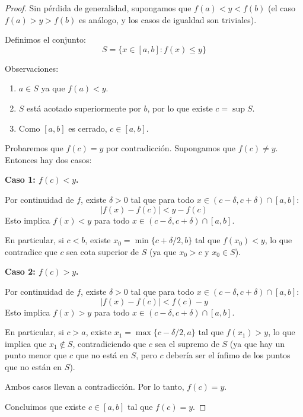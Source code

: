 \documentclass[11pt,a4paper]{article}
\theoremstyle{plain}
\theoremstyle{definition}
\begin{document}
\begin{proof}
Sin pérdida de generalidad, supongamos que $f(a) < y < f(b)$ (el caso $f(a) > y > f(b)$ es análogo, y los casos de igualdad son triviales).

Definimos el conjunto:
\[
S = \{x \in [a, b] : f(x) \leq y\}
\]

Observaciones:
\begin{enumerate}
    \item $a \in S$ ya que $f(a) < y$.
    \item $S$ está acotado superiormente por $b$, por lo que existe $c = \sup S$.
    \item Como $[a, b]$ es cerrado, $c \in [a, b]$.
\end{enumerate}

Probaremos que $f(c) = y$ por contradicción. Supongamos que $f(c) \neq y$. Entonces hay dos casos:

\textbf{Caso 1: $f(c) < y$.}

Por continuidad de $f$, existe $\delta > 0$ tal que para todo $x \in (c - \delta, c + \delta) \cap [a, b]$:
\[
|f(x) - f(c)| < y - f(c)
\]
Esto implica $f(x) < y$ para todo $x \in (c - \delta, c + \delta) \cap [a, b]$.

En particular, si $c < b$, existe $x_0 = \min\{c + \delta/2, b\}$ tal que $f(x_0) < y$, lo que contradice que $c$ sea cota superior de $S$ (ya que $x_0 > c$ y $x_0 \in S$).

\textbf{Caso 2: $f(c) > y$.}

Por continuidad de $f$, existe $\delta > 0$ tal que para todo $x \in (c - \delta, c + \delta) \cap [a, b]$:
\[
|f(x) - f(c)| < f(c) - y
\]
Esto implica $f(x) > y$ para todo $x \in (c - \delta, c + \delta) \cap [a, b]$.

En particular, si $c > a$, existe $x_1 = \max\{c - \delta/2, a\}$ tal que $f(x_1) > y$, lo que implica que $x_1 \notin S$, contradiciendo que $c$ sea el supremo de $S$ (ya que hay un punto menor que $c$ que no está en $S$, pero $c$ debería ser el ínfimo de los puntos que no están en $S$).

Ambos casos llevan a contradicción. Por lo tanto, $f(c) = y$.

Concluimos que existe $c \in [a, b]$ tal que $f(c) = y$.
\end{proof}
\end{document}
